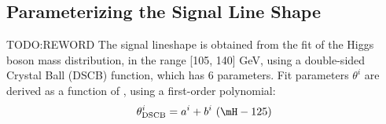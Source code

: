 %

\subsection{Parameterizing the Signal Line Shape}
\label{sec:SignalParametrization}
TODO:REWORD The signal lineshape is obtained from the fit of the Higgs boson mass distribution, 
in the range [105, 140] GeV, using a double-sided Crystal Ball (DSCB) function, which
has 6 parameters.
 Fit parameters $\theta^i$ are derived as a function of \mH, using a first-order polynomial:
\[
\theta^{i}_\text{DSCB} = a^i + b^{i}~(\mH - 125)%
\]

